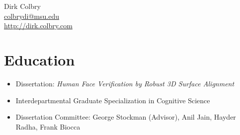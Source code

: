 
\begin{center}
  {\LARGE Dirk Colbry}\\[0.5em] 
  \href{mailto:colbrydi@msu.edu}{colbrydi@msu.edu} \\
  \href{http://dirk.colbry.com}{http://dirk.colbry.com}
\end{center}

\section*{Education}

\noindent{}

\begin{itemize}
  \item Dissertation: \emph{Human Face Verification by Robust 3D Surface Alignment}
  \item Interdepartmental Graduate Specialization in Cognitive Science
  \item Dissertation Committee: George Stockman (Advisor), Anil Jain, Hayder Radha, Frank Biocca
\end{itemize}

\noindent{}

\vspace{0.3em}

\noindent{}